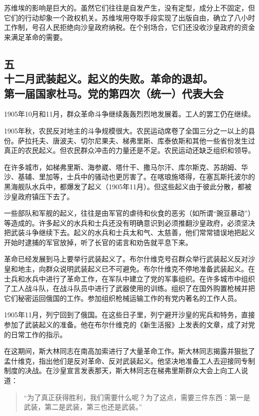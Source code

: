 苏维埃的影响是巨大的。虽然它们往往是自发产生，没有定型，成分上不固定，但它们的行动却象一个政权机关。苏维埃用夺取手段实现了出版自由，确立了八小时工作制，号召人民拒绝向沙皇政府纳税。在个别场合，它们还没收沙皇政府的资金来满足革命的需要。


\subsection[五\q 十二月武装起义。起义的失败。革命的退却。第一届国家杜马。党的第四次（统一）代表大会]{五\\十二月武装起义。起义的失败。革命的退却。\\第一届国家杜马。党的第四次（统一）代表大会}

1905年10月和11月，群众革命斗争继续轰轰烈烈地发展着。工人的罢工仍在继续。

1905年秋，农民反对地主的斗争规模很大。农民运动席卷了全国三分之一以上的县份。萨拉托夫、唐波夫、切尔尼果夫、梯弗里斯、库泰依斯和其他一些省份发生过真正的农民起义。但农民群众冲击的力量还是不足。农民运动还缺乏组织和领导。

在许多城市，如梯弗里斯、海参崴、塔什干、撒马尔汗、库尔斯克、苏胡姆、华沙、基辅、里加等，士兵中的骚动也更厉害了。在喀琅施塔得，在塞瓦斯托波尔的黑海舰队水兵中，都爆发了起义（1905年11月）。但这些起义由于彼此分散，都被沙皇政府镇压下去了。

一些部队和军舰的起义，往往是由军官的虐待和伙食的恶劣（如所谓“豌豆暴动”）等造成的。许多起义的水兵和士兵还没有明确意识到必须推翻沙皇政府，必须坚决把武装斗争继续下去。起义的水兵和士兵太和气、太慈善，他们常常错误地把起义开始时逮捕的军官放掉，听了长官的诺言和劝告就平息下来。

革命已经发展到马上要举行武装起义了。布尔什维克号召群众举行武装起义反对沙皇和地主，向群众说明武装起义已不可避免。布尔什维克不停地准备武装起义。在士兵和水兵中进行了革命工作，在军队中建立了党的军事组织。在许多城市中组织了工人战斗队，在战斗队员中进行了武器使用的训练。组织了在国外购置枪械并把它们秘密运回俄国的工作。参加组织枪械运输工作的有党内著名的工作人员。

1905年11月，列宁回到了俄国。在这些日子里，列宁避开沙皇的宪兵和特务，直接参加了武装起义的准备。他在布尔什维克的《新生活报》上发表的文章，成了对党的日常工作的指示。

在这期间，斯大林同志在南高加索进行了大量革命工作。斯大林同志揭露并狠批了孟什维克，指出他们是反对革命、反对武装起义。他坚决地准备工人去迎接同专制制度的决战。在沙皇宣言发表那天，斯大林同志在梯弗里斯群众大会上向工人说道：

\begin{quotation}
“为了真正获得胜利，我们需要什么呢？为了这点，需要三件东西：第一是武装，第二是武装，第三也还是武装。”
\end{quotation}


